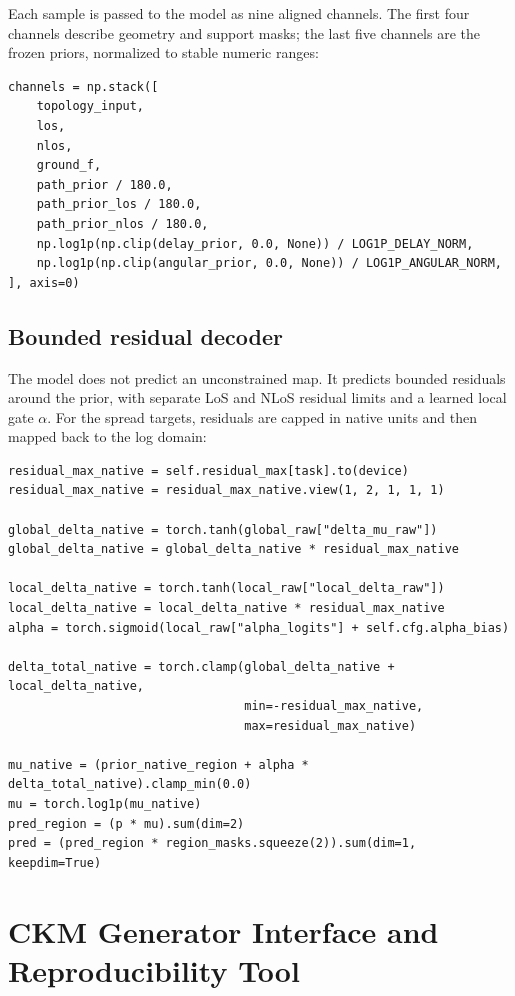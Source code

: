 Each sample is passed to the model as nine aligned channels. The first four
channels describe geometry and support masks; the last five channels are the
frozen priors, normalized to stable numeric ranges:

{\scriptsize
\begin{verbatim}
channels = np.stack([
    topology_input,
    los,
    nlos,
    ground_f,
    path_prior / 180.0,
    path_prior_los / 180.0,
    path_prior_nlos / 180.0,
    np.log1p(np.clip(delay_prior, 0.0, None)) / LOG1P_DELAY_NORM,
    np.log1p(np.clip(angular_prior, 0.0, None)) / LOG1P_ANGULAR_NORM,
], axis=0)
\end{verbatim}
}

\section{Bounded residual decoder}

The model does not predict an unconstrained map. It predicts bounded residuals
around the prior, with separate LoS and NLoS residual limits and a learned
local gate \(\alpha\). For the spread targets, residuals are capped in native
units and then mapped back to the log domain:

{\scriptsize
\begin{verbatim}
residual_max_native = self.residual_max[task].to(device)
residual_max_native = residual_max_native.view(1, 2, 1, 1, 1)

global_delta_native = torch.tanh(global_raw["delta_mu_raw"])
global_delta_native = global_delta_native * residual_max_native

local_delta_native = torch.tanh(local_raw["local_delta_raw"])
local_delta_native = local_delta_native * residual_max_native
alpha = torch.sigmoid(local_raw["alpha_logits"] + self.cfg.alpha_bias)

delta_total_native = torch.clamp(global_delta_native + local_delta_native,
                                 min=-residual_max_native,
                                 max=residual_max_native)

mu_native = (prior_native_region + alpha * delta_total_native).clamp_min(0.0)
mu = torch.log1p(mu_native)
pred_region = (p * mu).sum(dim=2)
pred = (pred_region * region_masks.squeeze(2)).sum(dim=1, keepdim=True)
\end{verbatim}
}

\chapter{CKM Generator Interface and Reproducibility Tool}
\label{chap:ckm_generator}
\label{app:ckm_generator}

